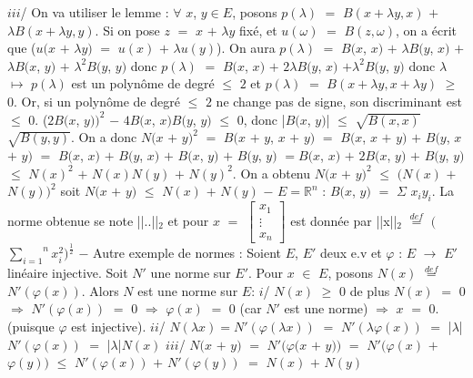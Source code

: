 \documentclass{article}
\begin{document}
$iii$/ On va utiliser le lemme : $\forall$ $x$, $y \in E$, posons $p(\lambda)$ $=$ $B(x + \lambda y, x)$ $+$ $\lambda B(x + \lambda y, y)$. Si on pose \smallbreak $z$ $=$ $x$ $+$ $\lambda y$ fixé, et $u(\omega)$ $=$ $B(z, \omega)$, on a écrit que ($u(x$ $+$ $\lambda y)$ $=$ $u(x)$ $+$ $\lambda u(y)$). \smallbreak On aura $p(\lambda)$ $=$ $B(x$, $x)$ $+$ $\lambda B(y$, $x)$ $+$ $\lambda B(x$, $y)$ $+$ $\lambda^2$$B(y$, $y)$ donc $p(\lambda)$ $=$ $B(x$, $x)$ $+$ $2\lambda B(y$, $x)$ $+$\smallbreak $\lambda^2$$B(y$, $y)$ donc $\lambda$ $\mapsto$ $p(\lambda)$ est un polynôme de degré $\leqslant$ $2$ et $p(\lambda)$ $=$ $B(x + \lambda y, x + \lambda y)$ $\geqslant$ $0$. \smallbreak Or, si un polynôme de degré $\leqslant$ $2$ ne change pas de signe, son discriminant est $\leqslant$ $0$. \smallbreak ($2B(x$, $y))^2$ $-$ $4B(x$, $x)B(y$, $y)$ $\leqslant$ $0$, donc |$B(x$, $y)$| $\leqslant$ $\sqrt{B(x, x)}$ $\sqrt{B(y, y)}$. On a donc $N(x$ $+$ $y)^2$ \smallbreak $=$ $B(x$  $+$ $y$, $x$  $+$ $y)$ $=$ $B(x$, $x$  $+$ $y)$ $+$ $B(y$, $x$  $+$ $y)$ $=$ $B(x$, $x)$ $+$ $B(y$, $x)$ $+$ $B(x$, $y)$ $+$ $B(y$, $y)$ $=$\smallbreak $B(x$, $x)$ $+$ $2B(x$, $y)$ $+$ $B(y$, $y)$ $\leqslant$ $N(x)^2$ $+$ $N(x)N(y)$ $+$ $N(y)^2$. \smallbreak On a obtenu $N(x$ $+$ $y)^2$ $\leqslant$ $(N(x)$ $+$ $N(y))^2$ soit $N(x$ $+$ $y)$ $\leqslant$ $N(x)$ $+$ $N(y)$
\parindent=1cm
\smallbreak
$-$ $E = \mathbb{R}^n$ : $B(x$, $y)$ $=$ $\Sigma$ $x_i$$y_i$. La norme obtenue se note ||..||$_2$ et pour $x$ $=$ 
$
\begin{bmatrix}
	x_1 \\
	\vdots \\
	x_n
\end{bmatrix}
$
 est donnée par \smallbreak ||x||$_2$ $\overset{ def }{=}$ $($$\overset{n}{\underset{i = 1}{\sum}} x_i^2)^{\frac{1}{2}}$
\smallbreak
$-$ Autre exemple de normes : Soient $E$, $E'$ deux e.v et $\varphi$ : $E$ $\rightarrow$ $E'$ linéaire injective. \smallbreak Soit $N'$ une norme sur $E'$. Pour $x$ $\in$ $E$, posons $N(x)$ $\overset{ def }{=}$ $N'(\varphi (x))$. Alors $N$ est une norme sur $E$:
\smallbreak $i$/ $N(x)$ $\geqslant$ $0$ de plus $N(x)$ $=$ $0$ $\Longrightarrow$ $N'(\varphi(x))$ $=$ $0$ $\Longrightarrow$ $\varphi(x)$ $=$ $0$ (car $N'$ est une norme) $\Longrightarrow$ $x$ $=$ $0$. (puisque \smallbreak$\varphi$ est injective).
\smallbreak
$ii$/ $N(\lambda x) = N'(\varphi(\lambda x))$ $=$ $N'(\lambda \varphi(x))$ $=$ |$\lambda$|$N'(\varphi(x))$ $=$ |$\lambda$|$N(x)$
\smallbreak
$iii$/ $N(x$ $+$ $y)$ $=$ $N'(\varphi(x$ $+$ $y))$ $=$ $N'(\varphi(x)$ $+$ $\varphi(y))$ $\leqslant$ $N'(\varphi(x))$ $+$ $N'(\varphi(y))$ $=$ $N(x)$ $+$ $N(y)$
\parindent=0cm
\end{document}
